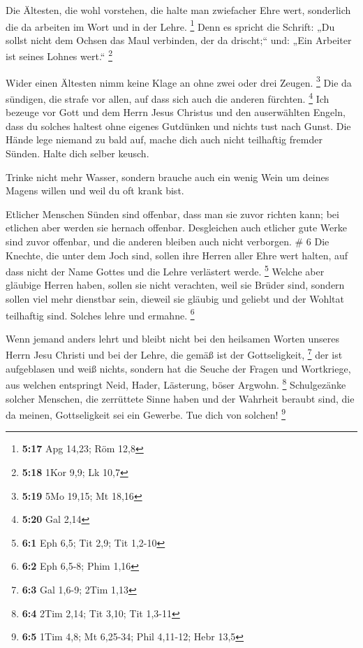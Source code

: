  Die Ältesten, die wohl vorstehen, die halte man
zwiefacher Ehre wert, sonderlich die da arbeiten im Wort und in der
Lehre. \footnote{\textbf{5:17} Apg 14,23; Röm 12,8}  Denn
es spricht die Schrift: „Du sollst nicht dem Ochsen das Maul verbinden,
der da drischt;`` und: „Ein Arbeiter ist seines Lohnes wert.``
\footnote{\textbf{5:18} 1Kor 9,9; Lk 10,7}

 Wider einen Ältesten nimm keine Klage an ohne zwei oder
drei Zeugen. \footnote{\textbf{5:19} 5Mo 19,15; Mt 18,16}
 Die da sündigen, die strafe vor allen, auf dass sich
auch die anderen fürchten. \footnote{\textbf{5:20} Gal 2,14}
 Ich bezeuge vor Gott und dem Herrn Jesus Christus und
den auserwählten Engeln, dass du solches haltest ohne eigenes Gutdünken
und nichts tust nach Gunst.  Die Hände lege niemand zu
bald auf, mache dich auch nicht teilhaftig fremder Sünden. Halte dich
selber keusch.

 Trinke nicht mehr Wasser, sondern brauche auch ein wenig
Wein um deines Magens willen und weil du oft krank bist.

 Etlicher Menschen Sünden sind offenbar, dass man sie
zuvor richten kann; bei etlichen aber werden sie hernach offenbar.
 Desgleichen auch etlicher gute Werke sind zuvor
offenbar, und die anderen bleiben auch nicht verborgen. \# 6
 Die Knechte, die unter dem Joch sind, sollen ihre Herren
aller Ehre wert halten, auf dass nicht der Name Gottes und die Lehre
verlästert werde. \footnote{\textbf{6:1} Eph 6,5; Tit 2,9; Tit 1,2-10}
 Welche aber gläubige Herren haben, sollen sie nicht
verachten, weil sie Brüder sind, sondern sollen viel mehr dienstbar
sein, dieweil sie gläubig und geliebt und der Wohltat teilhaftig sind.
Solches lehre und ermahne. \footnote{\textbf{6:2} Eph 6,5-8; Phim 1,16}

 Wenn jemand anders lehrt und bleibt nicht bei den
heilsamen Worten unseres Herrn Jesu Christi und bei der Lehre, die gemäß
ist der Gottseligkeit, \footnote{\textbf{6:3} Gal 1,6-9; 2Tim 1,13}
 der ist aufgeblasen und weiß nichts, sondern hat die
Seuche der Fragen und Wortkriege, aus welchen entspringt Neid, Hader,
Lästerung, böser Argwohn. \footnote{\textbf{6:4} 2Tim 2,14; Tit 3,10;
  Tit 1,3-11}  Schulgezänke solcher Menschen, die
zerrüttete Sinne haben und der Wahrheit beraubt sind, die da meinen,
Gottseligkeit sei ein Gewerbe. Tue dich von solchen! \footnote{\textbf{6:5}
  1Tim 4,8; Mt 6,25-34; Phil 4,11-12; Hebr 13,5}

